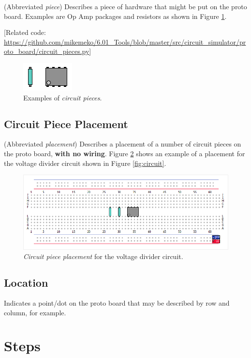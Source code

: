 \documentclass[12pt]{amsart}
\begin{document}
(Abbreviated \emph{piece}) Describes a piece of hardware that might be put on the proto board. Examples are Op Amp packages and resistors as shown in Figure \ref{fig:pieces}.

[Related code: \url{https://github.com/mikemeko/6.01_Tools/blob/master/src/circuit_simulator/proto_board/circuit_pieces.py}]

\begin{figure}
\includegraphics{Images/Circuit_Pieces.png}
\caption{Examples of \emph{circuit pieces}.}
\label{fig:pieces}
\end{figure}

\subsection{Circuit Piece Placement}

(Abbreviated \emph{placement}) Describes a placement of a number of circuit pieces on the proto board, \textbf{with no wiring}. Figure \ref{fig:placement} shows an example of a placement for the voltage divider circuit shown in Figure \ref{fig:circuit}.

\begin{figure}
\includegraphics[width=\linewidth]{Images/Circuit_Piece_Placement.png}
\caption{\emph{Circuit piece placement} for the voltage divider circuit.}
\label{fig:placement}
\end{figure}

\subsection{Location} Indicates a point/dot on the proto board that may be described by row and column, for example.

\section{Steps}
\end{document}
